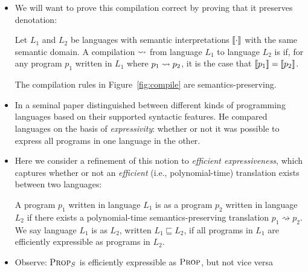 \documentclass{tufte-handout}
\begin{document}
\begin{itemize}
  \item We will want to prove this compilation correct by proving that it preserves denotation:
  \begin{definition}
    Let $L_1$ and $L_2$ be languages with semantic interpretations $\left \llbracket {\cdot} \right \rrbracket$
    with the same semantic domain.
    A compilation $\rightsquigarrow$ from language $L_1$ to language $L_2$ is
     if, for any program $p_1$ written in $L_1$ 
    where $p_1 \rightsquigarrow p_2$, it is the case that $\left \llbracket {p_1} \right \rrbracket = \left \llbracket {p_2} \right \rrbracket$.
  \end{definition}
  \begin{theorem}
    The compilation rules in Figure~\ref{fig:compile} are semantics-preserving.
  \end{theorem}
  \item In a seminal paper \citet{felleisen1990expressive} distinguished between
  different kinds of programming languages based on their supported syntactic features. He
  compared languages on the basis of \emph{expressivity}: whether or not it was
  possible to express all programs in one language in the other. 
  \item Here we consider a refinement of this notion to \emph{efficient
  expressiveness}, which captures whether or not an \emph{efficient} (i.e., polynomial-time)
  translation exists between two languages:
  \begin{definition}
    A program $p_1$ written in language $L_1$ is  
    as a program $p_2$ written in language $L_2$ if
    there exists a polynomial-time semantics-preserving translation $p_1
    \rightsquigarrow p_2$. 
    We say language $L_1$ is  as $L_2$, written $L_1 \sqsubseteq L_2$, 
    if all programs in $L_1$ are efficiently expressible as programs in $L_2$.
  \end{definition}

  \item Observe: $\textsc{Prop}_S$ is efficiently expressible as $\textsc{Prop}$, but not vice versa




\end{itemize}
\end{document}
